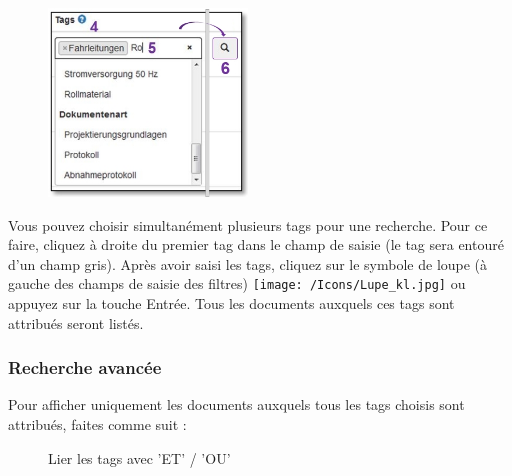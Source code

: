 \vspace{\baselineskip}

\begin{figure}
\vspace{-30pt}
\includegraphics[height=50mm]{../chapters/11_Dokumentenablage/pictures/11-2-8_TagEingabe.jpg}
\end{figure}
Vous pouvez choisir simultanément plusieurs tags pour une recherche. Pour ce faire, cliquez à droite du premier tag  dans le champ de saisie  (le tag sera entouré d'un champ gris). Après avoir saisi les tags, cliquez sur le symbole de loupe (à gauche des champs de saisie des filtres) \texttt{[image: /Icons/Lupe\_kl.jpg]}  ou appuyez sur la touche Entrée. Tous les documents auxquels ces tags sont attribués seront listés.

\vspace{\baselineskip}

\subsubsection{Recherche avancée}

Pour afficher uniquement les documents auxquels tous les tags choisis sont attribués, faites comme suit :

\begin{figure}[H]
\caption{Lier les tags avec 'ET' / 'OU'}
\end{figure}

